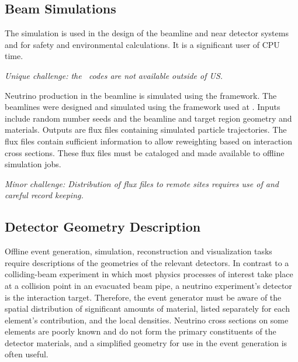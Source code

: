 \documentclass[../main-v1.tex]{subfiles}
\begin{document}


\subsection{Beam Simulations}
The \cite{abs1} simulation is used in the design of the beamline and near detector systems and  for safety and environmental calculations.  It is a significant user of CPU time. 

{\it Unique challenge: the \ codes are not available outside of US.}

Neutrino production in the  
beamline  is simulated using the  framework.  The  beamlines were designed and simulated using the  framework used at \cite{PhysRevAccelBeams.20.111001}.
Inputs include random number seeds and the beamline and target region geometry and materials.  Outputs are flux files containing simulated particle  trajectories.  The flux files contain sufficient information to allow reweighting based on interaction cross sections.  These flux files must be cataloged and made available to offline simulation jobs.

{\it Minor challenge:  Distribution of flux files to remote sites requires use of  and careful record keeping.}

\subsection{Detector Geometry Description }
\label{sec:usecases:detectorgeometry}

Offline event generation, simulation, reconstruction and visualization tasks require descriptions of the geometries of the relevant detectors.  In contrast to a colliding-beam experiment in which most physics processes of interest take place at a collision point in an evacuated beam pipe, a neutrino experiment's detector is the interaction target.  Therefore, the event generator must be aware of the spatial distribution of significant amounts of material, listed separately for each element's contribution, and the local densities.  Neutrino cross sections on some elements are poorly known and do not form the primary constituents of the detector materials, and a simplified geometry for use in the event generation is often useful.
\end{document}
